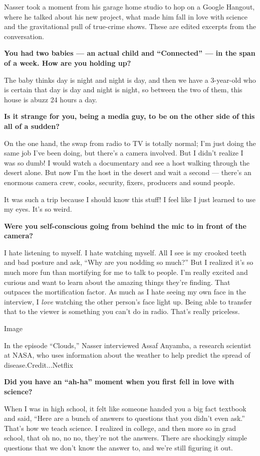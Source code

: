 Nasser took a moment from his garage home studio to hop on a Google
Hangout, where he talked about his new project, what made him fall in
love with science and the gravitational pull of true-crime shows. These
are edited excerpts from the conversation.

\textbf{You had two babies --- an actual child and ``Connected'' --- in
the span of a week. How are you holding up?}

The baby thinks day is night and night is day, and then we have a
3-year-old who is certain that day is day and night is night, so between
the two of them, this house is abuzz 24 hours a day.

\textbf{Is it strange for you, being a media guy, to be on the other
side of this all of a sudden?}

On the one hand, the swap from radio to TV is totally normal; I'm just
doing the same job I've been doing, but there's a camera involved. But I
didn't realize I was so dumb! I would watch a documentary and see a host
walking through the desert alone. But now I'm the host in the desert and
wait a second --- there's an enormous camera crew, cooks, security,
fixers, producers and sound people.

It was such a trip because I should know this stuff! I feel like I just
learned to use my eyes. It's so weird.

\textbf{Were you self-conscious going from behind the mic to in front of
the camera?}

I hate listening to myself. I hate watching myself. All I see is my
crooked teeth and bad posture and ask, ``Why are you nodding so much?''
But I realized it's so much more fun than mortifying for me to talk to
people. I'm really excited and curious and want to learn about the
amazing things they're finding. That outpaces the mortification factor.
As much as I hate seeing my own face in the interview, I \emph{love}
watching the other person's face light up. Being able to transfer that
to the viewer is something you can't do in radio. That's really
priceless.

Image

In the episode ``Clouds,'' Nasser interviewed Assaf Anyamba, a research
scientist at NASA, who uses information about the weather to help
predict the spread of disease.Credit...Netflix

\textbf{Did you have an ``ah-ha'' moment when you first fell in love
with science?}

When I was in high school, it felt like someone handed you a big fact
textbook and said, ``Here are a bunch of answers to questions that you
didn't even ask.'' That's how we teach science. I realized in college,
and then more so in grad school, that oh no, no no, they're not the
answers. There are shockingly simple questions that we don't know the
answer to, and we're still figuring it out.

